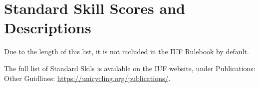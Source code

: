 \section{Standard Skill Scores and Descriptions}

Due to the length of this list, it is not included in the IUF Rulebook by default.

The full list of Standard Skils is available on the IUF website, under Publications: Other Guidlines: \url{https://unicycling.org/publications/}.
